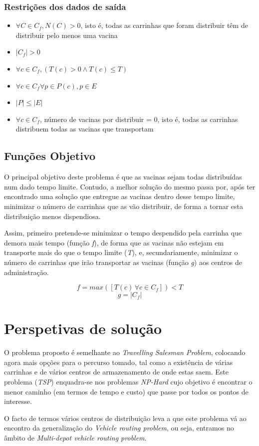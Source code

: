 \documentclass[12pt,a4paper]{report}
\begin{document}
	\subsection{Restrições dos dados de saída}
	\begin{itemize}
		\item \( \forall C \in C_f, N(C) > 0 \), isto é, todas as carrinhas que foram distribuir têm de distribuir pelo menos uma vacina
		\item \( |C_f| > 0 \)
		\item \( \forall c \in C_f, (T(c) > 0 \land T(c) \leq T)\)
		\item \( \forall c \in C_f \forall p \in P(c), p \in E \)
		\item \( |P| \leq |E| \)
		\item \( \forall c \in C_f \), número de vacinas por distribuir = 0, isto é, todas as carrinhas distribuem todas as vacinas que transportam
	\end{itemize}


	\section{Funções Objetivo}
	O principal objetivo deste problema é que as vacinas sejam todas distribuídas num dado tempo limite. Contudo, a melhor solução do mesmo passa por, após ter encontrado uma solução que entregue as vacinas dentro desse tempo limite, minimizar o número de carrinhas que as vão distribuir, de forma a tornar esta distribuição menos dispendiosa. \par
	Assim, primeiro pretende-se minimizar o tempo despendido pela carrinha que demora mais tempo (função \textit{f}), de forma que as vacinas não estejam em transporte mais do que o tempo limite (\textit{T}), e, secundariamente, minimizar o número de carrinhas que irão transportar as vacinas (função \textit{g}) aos centros de administração.

	\[ f = max([T(c)\, \forall c \in C_f]) < T\]
	\[ g = |C_f| \]



\chapter{Perspetivas de solução}
\label{perspetivas}
O problema proposto é semelhante ao \textit{Travelling Salesman Problem}, colocando agora mais opções para o percurso tomado, tal como a existência de várias carrinhas e de vários centros de armazenamento de onde estas saem. Este problema (\textit{TSP}) enquadra-se nos problemas \textit{NP-Hard} cujo objetivo é encontrar o menor caminho (em termos de tempo e custo) que passe por todos os pontos de interesse. \par
O facto de termos vários centros de distribuição leva a que este problema vá ao encontro da generalização do \textit{Vehicle routing problem}, ou seja, entramos no âmbito de \textit{Multi-depot vehicle routing problem}.
\end{document}
